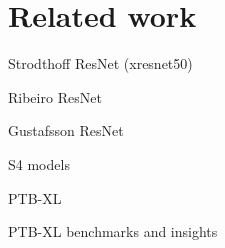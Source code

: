 \documentclass[journal,twoside,web]{ieeecolor}
\begin{document}

% 

\section{Related work}
Strodthoff ResNet (xresnet50) \cite{mehari2022}

Ribeiro ResNet \cite{ribeiro2020}

Gustafsson ResNet \cite{gustafsson2022}

S4 models \cite{mehari2023}

PTB-XL \cite{wagner2020}

PTB-XL benchmarks and insights \cite{strodthoff2020}




\end{document}
